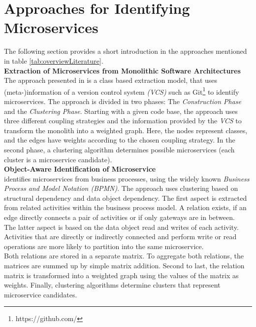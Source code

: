 \clearpage





\section{Approaches for Identifying Microservices}
\label{sec:stateOfTheArt:approaches}
The following section provides a short introduction in the approaches mentioned in table \ref{tab:overviewLiterature}. \\

\noindent
\textbf{Extraction of Microservices from Monolithic Software Architectures   } \\
The approach presented in \cite{ExtractionMazlami} is a class based extraction model, that uses (meta-)information of a version control system \textit{(VCS)} such as Git\footnote{https://github.com/} to identify microservices. The approach is divided in two phases: The \textit{Construction Phase} and the \textit{Clustering Phase}.
Starting with a given code base, the approach uses three different coupling strategies and the information provided by the \textit{VCS} to transform the monolith into a weighted graph. Here, the nodes represent classes, and the edges have weights according to the chosen coupling strategy. In the second phase, a clustering algorithm determines possible microservices (each cluster is a microservice candidate). \\

\noindent
\textbf{Object-Aware Identification of Microservice  } \\
\cite{ObjectAwareAmiri} identifies microservices from business processes, using the widely known \textit{Business Process and Model Notation (BPMN)}. The approach uses clustering based on structural dependency and data object dependency. The first aspect is extracted from related activities within the business process model. A relation exists, if an edge directly connects a pair of activities or if only gateways are in between. \\
The latter aspect is based on the data object read and writes of each activity. Activities that are directly or indirectly connected and perform write or read operations are more likely to partition into the same microservice. \\
Both relations are stored in a separate matrix. To aggregate both relations, the matrices are summed up by simple matrix addition. Second to last, the relation matrix is transformed into a weighted graph using the values of the matrix as weights. Finally, clustering algorithms determine clusters that represent microservice candidates.


